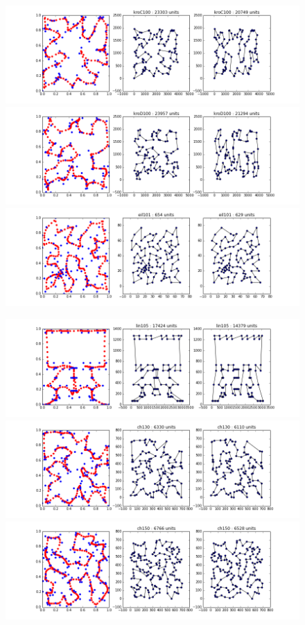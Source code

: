 \documentclass{article} %
\begin{document}
\begin{figure}[!htb]
\begin{center}
\includegraphics[scale=0.45]{figs/kroC100}
\includegraphics[scale=0.45]{figs/kroD100}
\includegraphics[scale=0.45]{figs/eil101}
 \end{center}
\end{figure}


\begin{figure}[!htb]
\begin{center}
\includegraphics[scale=0.45]{figs/lin105}
\includegraphics[scale=0.45]{figs/ch130}
\includegraphics[scale=0.45]{figs/ch150}
 \end{center}
\end{figure}


 
\end{document}
